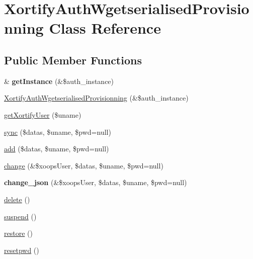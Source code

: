 \hypertarget{class_xortify_auth_wgetserialised_provisionning}{\section{Xortify\-Auth\-Wgetserialised\-Provisionning Class Reference}
\label{class_xortify_auth_wgetserialised_provisionning}
}
\subsection*{Public Member Functions}
\begin{DoxyCompactItemize}
\item 
\hypertarget{class_xortify_auth_wgetserialised_provisionning_a2c8eaa915c70d75289ac8a03686194f9}{\& {\bfseries get\-Instance} (\&\$auth\-\_\-instance)}\label{class_xortify_auth_wgetserialised_provisionning_a2c8eaa915c70d75289ac8a03686194f9}

\item 
\hyperlink{class_xortify_auth_wgetserialised_provisionning_aec6821499309e62b1196f632361b8849}{Xortify\-Auth\-Wgetserialised\-Provisionning} (\&\$auth\-\_\-instance)
\item 
\hyperlink{class_xortify_auth_wgetserialised_provisionning_a041d726ac26672547ed1504e8e0117aa}{get\-Xortify\-User} (\$uname)
\item 
\hyperlink{class_xortify_auth_wgetserialised_provisionning_a35dc08b0f2138eb818ff95345b73bcff}{sync} (\$datas, \$uname, \$pwd=null)
\item 
\hyperlink{class_xortify_auth_wgetserialised_provisionning_adfc9fcef01e7bd7b2f47e8e79d51fc63}{add} (\$datas, \$uname, \$pwd=null)
\item 
\hyperlink{class_xortify_auth_wgetserialised_provisionning_ae1f0971b9712c794620cf309164e43af}{change} (\&\$xoops\-User, \$datas, \$uname, \$pwd=null)
\item 
\hypertarget{class_xortify_auth_wgetserialised_provisionning_a94f4e0408f26e65abca347ec883f4ec9}{{\bfseries change\-\_\-json} (\&\$xoops\-User, \$datas, \$uname, \$pwd=null)}\label{class_xortify_auth_wgetserialised_provisionning_a94f4e0408f26e65abca347ec883f4ec9}

\item 
\hyperlink{class_xortify_auth_wgetserialised_provisionning_a13bdffdd926f26b825ea57066334ff01}{delete} ()
\item 
\hyperlink{class_xortify_auth_wgetserialised_provisionning_ad73006a505121228f3b075c2409787d2}{suspend} ()
\item 
\hyperlink{class_xortify_auth_wgetserialised_provisionning_aa1371f22826cf8cde4454c9b467203d0}{restore} ()
\item 
\hyperlink{class_xortify_auth_wgetserialised_provisionning_a06d70fbd3a2db390b6f2530c0076628e}{resetpwd} ()
\end{DoxyCompactItemize}
